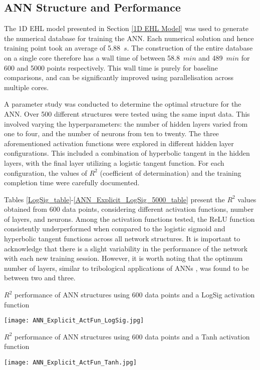 \subsection{ANN Structure and Performance}

The 1D EHL model presented in Section \ref{1D EHL Model} was used to generate the numerical database for training the ANN. Each numerical solution and hence training point took an average of 5.88~$s$. The construction of the entire database on a single core therefore has a wall time of between 58.8~$min$ and 489~$min$ for 600 and 5000 points respectively. This wall time is purely for baseline comparisons, and can be significantly improved using parallelisation across multiple cores.

A parameter study was conducted to determine the optimal structure for the ANN. Over 500 different structures were tested using the same input data. This involved varying the hyperparameters: the number of hidden layers varied from one to four, and the number of neurons from ten to twenty. The three aforementioned activation functions were explored in different hidden layer configurations. This included a combination of hyperbolic tangent in the hidden layers, with the final layer utilizing a logistic tangent function. For each configuration, the values of $R^2$ (coefficient of determination) and the training completion time were carefully documented.

Tables \ref{LogSig_table}-\ref{ANN_Explicit_LogSig_5000_table} present the $R^2$ values obtained from 600 data points, considering different activation functions, number of layers, and neurons. Among the activation functions tested, the ReLU function consistently underperformed when compared to the logistic sigmoid and hyperbolic tangent functions across all network structures. It is important to acknowledge that there is a slight variability in the performance of the network with each new training session. However, it is worth noting that the optimum number of layers, similar to tribological applications of ANNs \cite{Marian2021}, was found to be between two and three.

\begin{table}
	\caption{$R^2$ performance of ANN structures using 600 data points and a LogSig activation function}
	\label{LogSig_table}
	\texttt{[image: ANN\_Explicit\_ActFun\_LogSig.jpg]}
\end{table}

\begin{table}
	\caption{$R^2$ performance of ANN structures using 600 data points and a Tanh activation function}
	\label{Tanh_table}
	\texttt{[image: ANN\_Explicit\_ActFun\_Tanh.jpg]}
\end{table}

